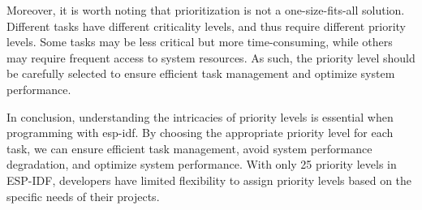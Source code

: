 Moreover, it is worth noting that prioritization is not a one-size-fits-all solution. Different tasks have different criticality levels, and thus require different priority levels. Some tasks may be less critical but more time-consuming, while others may require frequent access to system resources. As such, the priority level should be carefully selected to ensure efficient task management and optimize system performance.

In conclusion, understanding the intricacies of priority levels is essential when programming with esp-idf. By choosing the appropriate priority level for each task, we can ensure efficient task management, avoid system performance degradation, and optimize system performance. With only 25 priority levels in ESP-IDF, developers have limited flexibility to assign priority levels based on the specific needs of their projects.
